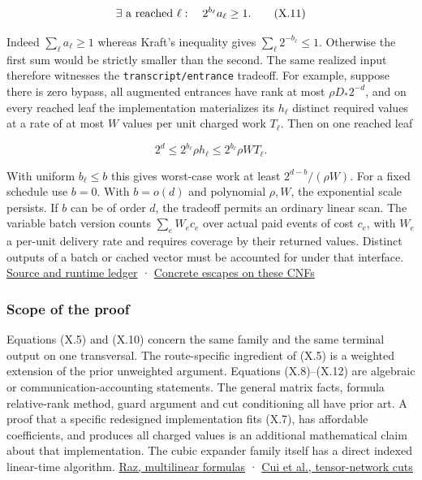 \documentclass[
  11pt,
]{article}
\begin{document}
\[
     \exists\hbox{ a reached }\ell:\quad 2^{b_\ell}a_\ell\ge1. \tag{X.11}
\]

Indeed \(\sum_\ell a_\ell\ge1\) whereas Kraft's inequality gives
\(\sum_\ell2^{-b_\ell}\le1\). Otherwise the first sum would be strictly
smaller than the second. The same realized input therefore witnesses the
\nolinkurl{transcript/entrance} tradeoff. For example, suppose there is
zero bypass, all augmented entrances have rank at most
\(\rho D_*2^{-d}\), and on every reached leaf the implementation
materializes its \(h_\ell\) distinct required values at a rate of at
most \(W\) values per unit charged work \(T_\ell\). Then on one reached
leaf

\[
       2^d\le 2^{b_\ell}\rho h_\ell
                          \le 2^{b_\ell}\rho W T_\ell .       \tag{X.12}
\]

With uniform \(b_\ell\le b\) this gives worst-case work at least
\(2^{d-b}/(\rho W)\). For a fixed schedule use \(b=0\). With \(b=o(d)\)
and polynomial \(\rho,W\), the exponential scale persists. If \(b\) can
be of order \(d\), the tradeoff permits an ordinary linear scan. The
variable batch version counts \(\sum_e W_ec_e\) over actual paid events
of cost \(c_e\), with \(W_e\) a per-unit delivery rate and requires
coverage by their returned values. Distinct outputs of a batch or cached
vector must be accounted for under that interface.
\href{https://github.com/dch-and-Elara/some-research-inspired-by-openais-eth-preprint/tree/main/rank-budget-barriers}{Source and runtime ledger} ·
\href{https://github.com/dch-and-Elara/some-research-inspired-by-openais-eth-preprint/tree/main/rank-budget-barriers}{Concrete escapes on these
CNFs}

\subsubsection{Scope of the proof}\label{scope-of-the-proof}

Equations (X.5) and (X.10) concern the same family and the same terminal
output on one transversal. The route-specific ingredient of (X.5) is a
weighted extension of the prior unweighted argument. Equations
(X.8)--(X.12) are algebraic or communication-accounting statements. The
general matrix facts, formula relative-rank method, guard argument and
cut conditioning all have prior art. A proof that a specific redesigned
implementation fits (X.7), has affordable coefficients, and produces all
charged values is an additional mathematical claim about that
implementation. The cubic expander family itself has a direct indexed
linear-time algorithm.
\href{https://eccc.weizmann.ac.il/report/2003/067/}{Raz, multilinear
formulas} · \href{https://arxiv.org/abs/1508.04644}{Cui et al.,
tensor-network cuts}
\end{document}
